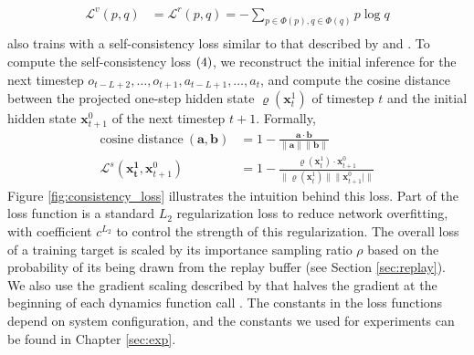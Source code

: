 \begin{align*}
    \mathcal{L}^v(p, q)  & = \mathcal{L}^r(p, q) = - \sum_{p \in \Phi(p), q \in \Phi(q)} p \log{q}  \\
\end{align*}
\moozi also trains with a self-consistency loss similar to that described by \citeauthor{MasteringAtariGames_Ye.Liu.ea_2021} and \citeauthor{VisualizingMuZeroModels_deVries.Voskuil.ea_2021} \cite{MasteringAtariGames_Ye.Liu.ea_2021,VisualizingMuZeroModels_deVries.Voskuil.ea_2021}.
To compute the self-consistency loss $(4)$, we reconstruct the initial inference for the next timestep \(o_{t-L+2}, \dots, o_{t+1}, a_{t-L+1}, \dots, a_{t}\), and compute the cosine distance between the projected one-step hidden state $\varrho(\mathbf{x}^1_t)$ of timestep $t$ and the initial hidden state $\mathbf{x}^0_{t+1}$ of the next timestep $t+1$.
Formally,
\begin{align*}
    \text{cosine distance} ~ (\mathbf{a}, \mathbf{b})
                                                       & = 1 - \frac{\mathbf{a} \cdot \mathbf{b}}{\|\mathbf{a}\|\|\mathbf{b}\|}  \\
    \mathcal{L}^s(\mathbf{x^1_t}, \mathbf{x}^0_{t+1})  & = 1 - \frac{\varrho(\mathbf{x}^1_t) \cdot \mathbf{x}^0_{t+1}}{\|\varrho(\mathbf{x}^1_t)\| \| \mathbf{x}^0_{t+1}|\|}
\end{align*}
Figure \ref{fig:consistency_loss} illustrates the intuition behind this loss.
Part  of the loss function is a standard $L_2$ regularization loss to reduce network overfitting,
with coefficient $c^{L_2}$ to control the strength of this regularization.
The overall loss of a training target is scaled by its importance sampling ratio $\rho$ based on the probability of its being drawn from the replay buffer (see Section \ref{sec:replay}).
We also use the gradient scaling described by \citeauthor{MasteringAtariGo_Schrittwieser.Antonoglou.ea_2020}
that halves the gradient at the beginning of each dynamics function call \cite{MasteringAtariGo_Schrittwieser.Antonoglou.ea_2020}.
The constants in the loss functions depend on system configuration, and the constants we used for experiments can be found in Chapter \ref{sec:exp}.

